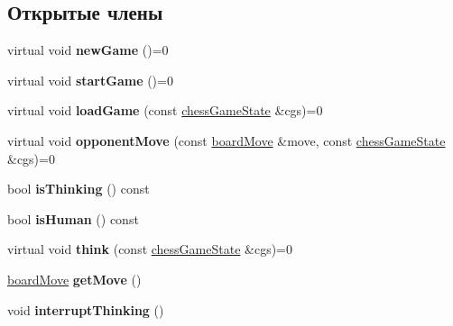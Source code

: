 \subsection*{Открытые члены}
\begin{DoxyCompactItemize}
\item 
\hypertarget{classchess_player_aa48ff4eddf1d46cbb989c0c00d779c83}{}virtual void {\bfseries new\+Game} ()=0\label{classchess_player_aa48ff4eddf1d46cbb989c0c00d779c83}

\item 
\hypertarget{classchess_player_a05e0031986866997afb0b861bda8f344}{}virtual void {\bfseries start\+Game} ()=0\label{classchess_player_a05e0031986866997afb0b861bda8f344}

\item 
\hypertarget{classchess_player_a0381db4f0afd40017762e9208eeff7b0}{}virtual void {\bfseries load\+Game} (const \hyperlink{classchess_game_state}{chess\+Game\+State} \&cgs)=0\label{classchess_player_a0381db4f0afd40017762e9208eeff7b0}

\item 
\hypertarget{classchess_player_acbb4583ddc816cf38b56d8c282aad412}{}virtual void {\bfseries opponent\+Move} (const \hyperlink{classboard_move}{board\+Move} \&move, const \hyperlink{classchess_game_state}{chess\+Game\+State} \&cgs)=0\label{classchess_player_acbb4583ddc816cf38b56d8c282aad412}

\item 
\hypertarget{classchess_player_a87501ca68fe97a4442f0e31e467c1820}{}bool {\bfseries is\+Thinking} () const \label{classchess_player_a87501ca68fe97a4442f0e31e467c1820}

\item 
\hypertarget{classchess_player_a0259369e1067e023a6f50f078a30cde3}{}bool {\bfseries is\+Human} () const \label{classchess_player_a0259369e1067e023a6f50f078a30cde3}

\item 
\hypertarget{classchess_player_aeed885d79b86767bc664f5f39c1b7df3}{}virtual void {\bfseries think} (const \hyperlink{classchess_game_state}{chess\+Game\+State} \&cgs)=0\label{classchess_player_aeed885d79b86767bc664f5f39c1b7df3}

\item 
\hypertarget{classchess_player_a55cdc430ded2d4c874bbd77a5c8d8f63}{}\hyperlink{classboard_move}{board\+Move} {\bfseries get\+Move} ()\label{classchess_player_a55cdc430ded2d4c874bbd77a5c8d8f63}

\item 
\hypertarget{classchess_player_a0e6d70cf9b9a52087055e755eb90532d}{}void {\bfseries interrupt\+Thinking} ()\label{classchess_player_a0e6d70cf9b9a52087055e755eb90532d}


\end{DoxyCompactItemize}
